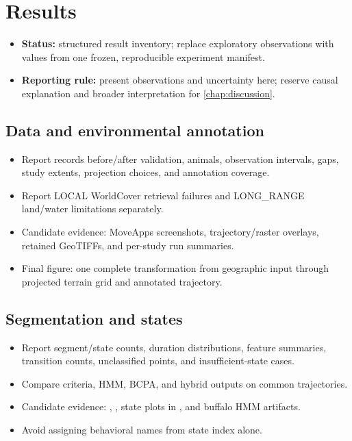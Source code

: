 \chapter{Results}
\label{chap:results}

\begin{itemize}
  \item \textbf{Status:} structured result inventory; replace exploratory observations with values from one frozen, reproducible experiment manifest.
  \item \textbf{Reporting rule:} present observations and uncertainty here; reserve causal explanation and broader interpretation for \cref{chap:discussion}.
\end{itemize}

\section{Data and environmental annotation}

\begin{itemize}
  \item Report records before/after validation, animals, observation intervals, gaps, study extents, projection choices, and annotation coverage.
  \item Report LOCAL WorldCover retrieval failures and LONG\_RANGE land/water limitations separately.
  \item Candidate evidence: MoveApps screenshots, trajectory/raster overlays, retained GeoTIFFs, and per-study run summaries.
  \item Final figure: one complete transformation from geographic input through projected terrain grid and annotated trajectory.
\end{itemize}

\section{Segmentation and states}

\begin{itemize}
  \item Report segment/state counts, duration distributions, feature summaries, transition counts, unclassified points, and insufficient-state cases.
  \item Compare criteria, HMM, BCPA, and hybrid outputs on common trajectories.
  \item Candidate evidence: , , state plots in , and buffalo HMM artifacts.
  \item Avoid assigning behavioral names from state index alone.
\end{itemize}

